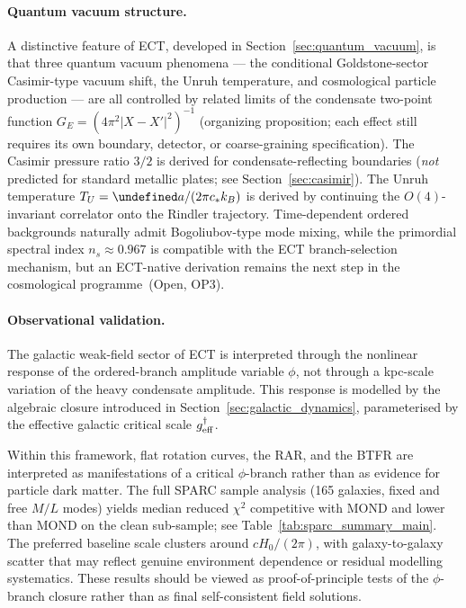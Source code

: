\documentclass[11pt,a4paper]{article}
\let\hbar\undefined
\numberwithin{equation}{section}
\begin{document}
\paragraph{Quantum vacuum structure.}

A distinctive feature of ECT, developed in Section~\ref{sec:quantum_vacuum},
is that three quantum vacuum phenomena --- the conditional Goldstone-sector
Casimir-type vacuum shift, the Unruh temperature, and cosmological particle
production --- are all controlled
by related limits of the condensate two-point function
$G_E=(4\pi^2|X-X'|^2)^{-1}$ (organizing proposition;
each effect still requires its own boundary, detector, or
coarse-graining specification).
The Casimir pressure ratio $3/2$ is derived for condensate-reflecting
boundaries (\emph{not} predicted for standard metallic plates;
see Section~\ref{sec:casimir}).
The Unruh temperature $T_U=\hbar a/(2\pi c_* k_B)$ is derived by
continuing the $O(4)$-invariant correlator onto the Rindler trajectory.
Time-dependent ordered backgrounds naturally admit Bogoliubov-type mode
mixing, while the primordial spectral index $n_s \approx 0.967$ is compatible
with the ECT branch-selection mechanism, but an ECT-native derivation
remains the next step in the cosmological programme~(Open, OP3).

\paragraph{Observational validation.}

The galactic weak-field sector of ECT is interpreted through
the nonlinear response of the ordered-branch amplitude variable $\phi$, not
through a kpc-scale variation of the heavy condensate amplitude.
This response is modelled by the algebraic closure
introduced in Section~\ref{sec:galactic_dynamics}, parameterised
by the effective galactic critical scale $g^\dagger_{\rm eff}$.

Within this framework, flat rotation curves, the RAR, and the
BTFR are interpreted as manifestations of a critical $\phi$-branch
rather than as evidence for particle dark matter.  The full SPARC
sample analysis (165 galaxies, fixed and free $M/L$ modes)
yields median reduced $\chi^2$ competitive with MOND and lower
than MOND on the clean sub-sample; see Table~\ref{tab:sparc_summary_main}.
The preferred baseline scale clusters around $cH_0/(2\pi)$,
with galaxy-to-galaxy scatter that may reflect genuine environment
dependence or residual modelling systematics.  These results should
be viewed as proof-of-principle tests of the $\phi$-branch closure
rather than as final self-consistent field solutions.
\end{document}
